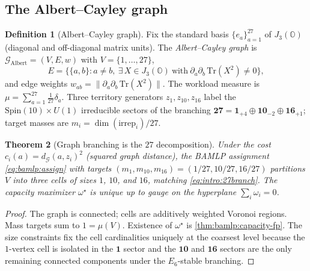 \documentclass[11pt]{article}
\theoremstyle{plain}
\newtheorem{theorem}{Theorem}[section]
\theoremstyle{definition}
\newtheorem{definition}[theorem]{Definition}
\theoremstyle{remark}
\begin{document}
\subsection{The Albert--Cayley graph}
\label{sec:identification:graph}

\begin{definition}[Albert--Cayley graph]\label{def:identification:graph}
Fix the standard basis $\{e_a\}_{a=1}^{27}$ of $J_3(\mathbb{O})$ (diagonal and
off-diagonal matrix units). The \emph{Albert--Cayley graph} is
$\mathcal{G}_{\mathrm{Albert}}=(V,E,w)$ with $V=\{1,\dots,27\}$,
\begin{equation}
  E=\bigl\{\{a,b\}: a\ne b,\ \exists\,X\in J_3(\mathbb{O})\ \text{with}\ 
  \partial_a\partial_b\,\mathrm{Tr}(X^2)\ne0\bigr\},
\end{equation}
and edge weights $w_{ab}=\|\partial_a\partial_b\,\mathrm{Tr}(X^2)\|$. The
workload measure is $\mu=\sum_{a=1}^{27}\tfrac{1}{27}\delta_a$. Three territory
generators $z_1,z_{10},z_{16}$ label the $\mathrm{Spin}(10)\times U(1)$
irreducible sectors of the branching
$\mathbf{27}=\mathbf{1}_{+4}\oplus\mathbf{10}_{-2}\oplus\mathbf{16}_{+1}$; target
masses are $m_i=\dim(\mathrm{irrep}_i)/27$.
\end{definition}

\begin{theorem}[Graph branching is the $27$ decomposition]\label{thm:identification:branch}
Under the cost $c_i(a)=d_{\mathcal{G}}(a,z_i)^2$ (squared graph distance), the
BAMLP assignment \eqref{eq:bamlp:assign} with targets
$(m_1,m_{10},m_{16})=(1/27,10/27,16/27)$ partitions $V$ into three cells of
sizes $1$, $10$, and $16$, matching \eqref{eq:intro:27branch}. The capacity
maximizer $\omega^\star$ is unique up to gauge on the hyperplane
$\sum_i\omega_i=0$.
\end{theorem}

\begin{proof}
The graph is connected; cells are additively weighted Voronoi regions. Mass
targets sum to $1=\mu(V)$. Existence of $\omega^\star$ is
\autoref{thm:bamlp:capacity-fp}. The size constraints fix the cell cardinalities
uniquely at the coarsest level because the $1$-vertex cell is isolated in the
$\mathbf{1}$ sector and the $\mathbf{10}$ and $\mathbf{16}$ sectors are the
only remaining connected components under the $E_6$-stable branching.
\end{proof}
\end{document}
